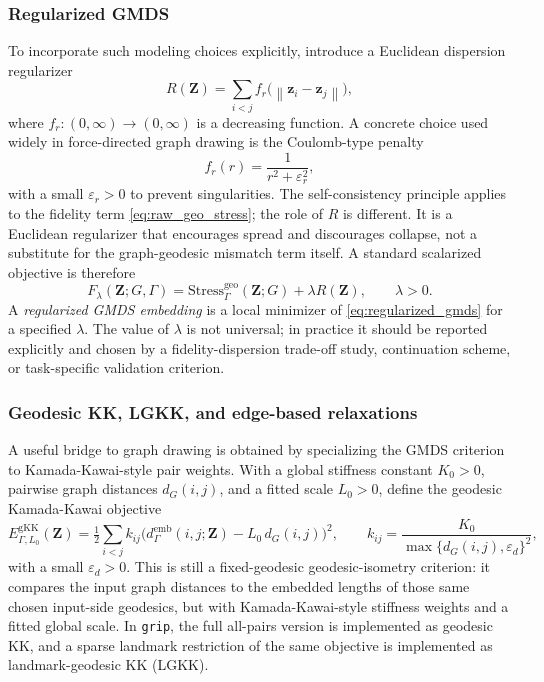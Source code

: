\documentclass[11pt]{article}
\newcommand{\bz}{\mathbf{z}}
\newcommand{\bZ}{\mathbf{Z}}
\newcommand{\norm}[1]{\left\|#1\right\|}
\newcommand{\demb}{d^{\mathrm{emb}}}
\newcommand{\Stress}{\mathrm{Stress}}
\begin{document}
\subsubsection*{Regularized GMDS}
To incorporate such modeling choices explicitly, introduce a Euclidean
dispersion regularizer
\begin{equation}
  R(\bZ) = \sum_{i < j} f_r\bigl(\norm{\bz_i - \bz_j}\bigr),
  \label{eq:repulsive_regularizer}
\end{equation}
where $f_r : (0,\infty) \to (0,\infty)$ is a decreasing function.  A
concrete choice used widely in force-directed graph drawing is the Coulomb-type
penalty
\begin{equation}
  f_r(r) = \frac{1}{r^2 + \varepsilon_r^2},
  \label{eq:coulomb_regularizer}
\end{equation}
with a small $\varepsilon_r > 0$ to prevent singularities.  The
self-consistency principle applies to the fidelity term
\cref{eq:raw_geo_stress}; the role of $R$ is different.  It is a Euclidean
regularizer that encourages spread and discourages collapse, not a substitute
for the graph-geodesic mismatch term itself.  A standard scalarized objective
is therefore
\begin{equation}
  F_\lambda(\bZ; G,\Gamma)
  = \Stress^{\mathrm{geo}}_{\Gamma}(\bZ; G) + \lambda R(\bZ),
  \qquad \lambda > 0.
  \label{eq:regularized_gmds}
\end{equation}
A \emph{regularized GMDS embedding} is a local minimizer of
\cref{eq:regularized_gmds} for a specified $\lambda$.  The value of
$\lambda$ is not universal; in practice it should be reported explicitly and
chosen by a fidelity-dispersion trade-off study, continuation scheme, or
task-specific validation criterion.

\subsubsection*{Geodesic KK, LGKK, and edge-based relaxations}
A useful bridge to graph drawing is obtained by specializing the GMDS
criterion to Kamada-Kawai-style pair weights.  With a global stiffness
constant $K_0 > 0$, pairwise graph distances $d_G(i,j)$, and a fitted
scale $L_0 > 0$, define the geodesic Kamada-Kawai objective
\begin{equation}
  E_{\Gamma,L_0}^{\mathrm{gKK}}(\bZ)
  = \tfrac{1}{2}\sum_{i<j}
    k_{ij}\bigl(\demb_{\Gamma}(i,j;\bZ) - L_0\,d_G(i,j)\bigr)^2,
  \qquad
  k_{ij} = \frac{K_0}{\max\{d_G(i,j), \varepsilon_d\}^2},
  \label{eq:geodesic_kk}
\end{equation}
with a small $\varepsilon_d > 0$.  This is still a fixed-geodesic
geodesic-isometry criterion: it compares the input graph distances to the
embedded lengths of those same chosen input-side geodesics, but with
Kamada-Kawai-style stiffness weights and a fitted global scale.  In
\texttt{grip}, the full all-pairs version is implemented as geodesic KK,
and a sparse landmark restriction of the same objective is implemented as
landmark-geodesic KK (LGKK).
\end{document}

